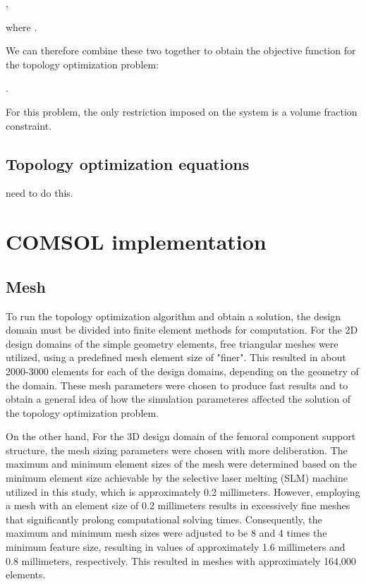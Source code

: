 \documentclass[../main.tex]{subfiles}
\begin{document}
,

where .

We can therefore combine these two together to obtain the objective function for the topology optimization problem:

.

For this problem, the only restriction imposed on the system is a volume fraction constraint.

\subsection{Topology optimization equations}

need to do this.

\section{COMSOL implementation}

\subsection{Mesh}

To run the topology optimization algorithm and obtain a solution, the design domain must be divided into finite element methods for computation. For the 2D design domains of the simple geometry elements, free triangular meshes were utilized, using a predefined mesh element size of "finer". This resulted in about 2000-3000 elements for each of the design domains, depending on the geometry of the domain. These mesh parameters were chosen to produce fast results and to obtain a general idea of how the simulation parameteres affected the solution of the topology optimization problem.


On the other hand, For the 3D design domain of the femoral component support structure, the mesh sizing parameters were chosen with more deliberation. The maximum and minimum element sizes of the mesh were determined based on the minimum element size achievable by the selective laser melting (SLM) machine utilized in this study, which is approximately 0.2 millimeters. However, employing a mesh with an element size of 0.2 millimeters results in excessively fine meshes that significantly prolong computational solving times. Consequently, the maximum and minimum mesh sizes were adjusted to be 8 and 4 times the minimum feature size, resulting in values of approximately 1.6 millimeters and 0.8 millimeters, respectively. This resulted in meshes with approximately 164,000 elements.
\end{document}
